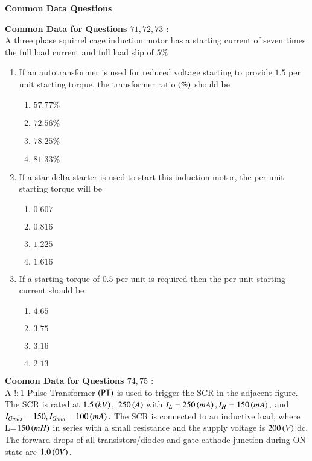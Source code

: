 \documentclass[journal,15pt,onecolumn]{IEEEtran}
\theoremstyle{remark}
\begin{document}
\begin{center}
    \textbf{Common Data Questions}
\end{center}
\textbf{Common Data for Questions $71,72,73 $ $:$}\\
A three phase squirrel cage induction motor has a starting current of seven times the full load current and full load slip of $5\%$ 
\begin{enumerate}[start=71]
    \item If an autotransformer is used for reduced voltage starting to provide $1.5$ per unit starting torque, the transformer ratio $\left(\%\right)$ should be
    
    \begin{enumerate}
        \item $57.77\%$
        \item $72.56\%$
        \item $78.25\%$
        \item $81.33\%$
    \end{enumerate}
    \item If a star-delta starter is used to start this induction motor, the per unit starting torque will be
    \begin{enumerate}
        \item $0.607$
        \item $0.816$
        \item $1.225$
        \item $1.616$
    \end{enumerate}
    \item If a starting torque of $0.5$ per unit is required then the per unit starting current should be 
    \begin{enumerate}
        \item $4.65$
        \item $3.75$
        \item $3.16$
        \item $2.13$
    \end{enumerate}
\end{enumerate}
\textbf{Coomon Data for Questions $74,75$ $:$}\\
A $!:1$ Pulse Transformer $\left(\text{PT}\right)$ is used to trigger the SCR in the adjacent figure. The SCR is rated at $1.5\left(kV\right),$ $250\left(A\right)$ with $I_L=250\left(mA\right),I_H=150\left(mA\right),$ and $I_{Gmax}=150,I_{Gmin}=100\left(mA\right).$ The SCR is connected to an inductive load, where L=$150\left(mH\right)$ in series with a small resistance and the supply voltage is $200\left(V\right)$ dc. The forward drops of all transistors/diodes and gate-cathode junction during ON state are $1.0\left(0V\right).$
\end{document}
